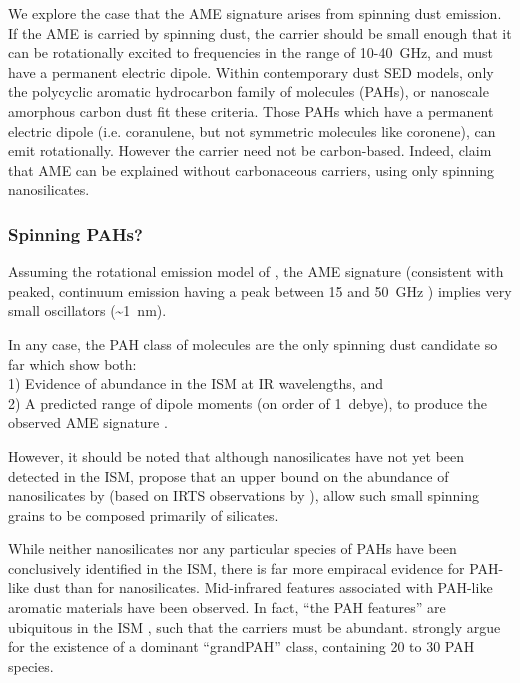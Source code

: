       We explore the case that the AME signature arises from spinning dust emission. If the AME is carried by spinning dust, the carrier should be small enough that it can be rotationally excited to frequencies in the range of 10-40~GHz, and must have a permanent electric dipole. Within contemporary dust SED models, only the polycyclic aromatic hydrocarbon family of molecules (PAHs), or nanoscale amorphous carbon dust fit these criteria. Those PAHs which have a permanent electric dipole (i.e. coranulene, but not symmetric molecules like coronene), can emit rotationally. However the carrier need not be carbon-based. Indeed, \cite{hensley17a} claim that AME can be explained without carbonaceous carriers, using only spinning nanosilicates.

     \subsubsection{Spinning PAHs?}
       Assuming the rotational emission model of \cite{draine98b}, the AME signature (consistent with peaked, continuum emission having a peak between 15 and 50~GHz ) implies very small oscillators (\textasciitilde{}1~nm).

       In any case, the PAH class of molecules are the only spinning dust candidate so far which show both: \\
       1) Evidence of abundance in the ISM at IR wavelengths, and \\
       2) A predicted range of dipole moments (on order of 1~debye), to produce the observed AME signature \citep{draine98b, lovas05, thorwirth07}.

       However, it should be noted that although nanosilicates have not yet been detected in the ISM, \cite{hensley17a} propose that an upper bound on the abundance of nanosilicates by \cite{li01} (based on IRTS observations by \cite{onaka96}), allow such small spinning grains to be composed primarily of silicates.

    While neither nanosilicates nor any particular species of PAHs have been conclusively identified in the ISM, there is far more empiracal evidence for PAH-like dust than for nanosilicates. Mid-infrared features associated with PAH-like aromatic materials have been observed. In fact, ``the PAH features'' are ubiquitous in the ISM \citep{giard94,onaka96,onaka00}, such that the carriers must be abundant. \cite{andrews15} strongly argue for the  existence of a dominant ``grandPAH'' class, containing 20 to 30 PAH species.

